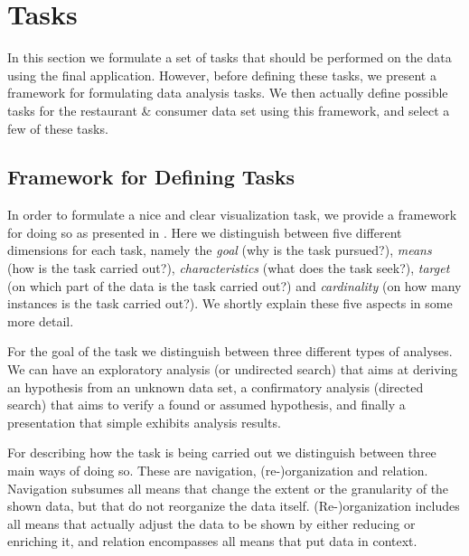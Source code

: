 \section{Tasks}\label{sec:tasks}


In this section we formulate a set of tasks that should be performed on the data using the final application. However, before defining these tasks, we present a framework for formulating data analysis tasks. We then actually define possible tasks for the restaurant \& consumer data set using this framework, and select a few of these tasks.

\subsection{Framework for Defining Tasks}\label{subsec:task_frame}
In order to formulate a nice and clear visualization task, we provide a framework for doing so as presented in \cite{schulz2013design}. Here we distinguish between five different dimensions for each task, namely the \textit{goal} (why is the task pursued?), \textit{means} (how is the task carried out?), \textit{characteristics} (what does the task seek?), \textit{target} (on which part of the data is the task carried out?) and \textit{cardinality} (on how many instances is the task carried out?). We shortly explain these five aspects in some more detail.

For the goal of the task we distinguish between three different types of analyses. We can have an exploratory analysis (or undirected search) that aims at deriving an hypothesis from an unknown data set, a confirmatory analysis (directed search) that aims to verify a found or assumed hypothesis, and finally a presentation that simple exhibits analysis results.

For describing how the task is being carried out we distinguish between three main ways of doing so. These are navigation, (re-)organization and relation. Navigation subsumes all means that change the extent or the granularity of the shown data, but that do not reorganize the data itself. (Re-)organization includes all means that actually adjust the data to be shown by either reducing or enriching it, and relation encompasses all means that put data in context.

